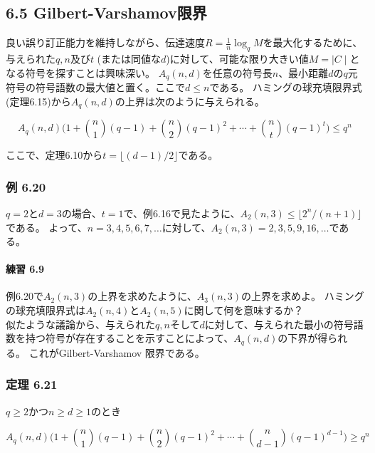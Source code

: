\documentclass[12pt,a4paper]{article}
\begin{document}
  \subsection*{6.5 Gilbert-Varshamov限界}
    
    良い誤り訂正能力を維持しながら、伝達速度$R = \frac{1}{n} \log_q M$を最大化するために、与えられた$q, n$及び$t $ (または同値な$d$)に対して、可能な限り大きい値$M = \mid C \mid $となる符号を探すことは興味深い。
    $A_q (n, d)$を任意の符号長$n$、最小距離$d$の$q$元符号の符号語数の最大値と置く。ここで$d \leq n$である。
    ハミングの球充填限界式 (定理6.15)から$A_q (n, d)$の上界は次のように与えられる。

    \[A_q (n, d) \big(1 + \binom n1 (q - 1) + \binom n2 {(q - 1)}^2 + \cdots + \binom nt {(q - 1)}^t \big) \leq q^n\]

    ここで、定理6.10から$t = \lfloor (d - 1) / 2 \rfloor$である。

    \subsubsection*{例 6.20}
      
    $q = 2$と$d = 3$の場合、$t = 1$で、例6.16で見たように、$A_2 (n, 3) \leq \lfloor 2^n / (n + 1) \rfloor$である。
    よって、$n = 3, 4, 5, 6, 7, \dots $に対して、$A_2 (n, 3) = 2, 3, 5, 9, 16, \dots $である。

      \paragraph{練習 6.9}
        
      例6.20で$A_2 (n, 3)$の上界を求めたように、$A_3(n, 3)$の上界を求めよ。
      ハミングの球充填限界式は$A_2 (n, 4)$と$A_2 (n,5)$に関して何を意味するか？ \\

    似たような議論から、与えられた$q, n$そして$d$に対して、与えられた最小の符号語数を持つ符号が存在することを示すことによって、$A_q(n, d)$の下界が得られる。
    これがGilbert-Varshamov 限界である。

    \subsubsection*{定理 6.21}
      $q \geq 2$かつ$n \geq d \geq 1$のとき

      \[A_q (n, d) \big( 1 + \binom n1 (q - 1) + \binom n2 {(q- 1)}^2 + \cdots + \binom{n}{d - 1}{(q - 1)}^{d -1}  \big) \geq q^n \]
\end{document}
